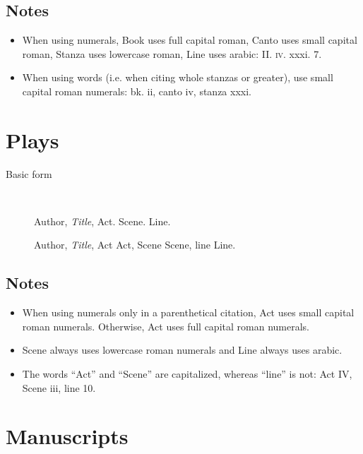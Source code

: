 \documentclass[extrafontsizes,11pt,a4paper,oneside]{memoir}
\newcommand*{\lit}[1]{\textsf{#1}}
\begin{document}
\section{Notes}

\begin{itemize}
  \item When using numerals, Book uses full capital roman, Canto uses small capital roman, Stanza uses lowercase roman, Line uses arabic: II. \textsc{iv}. xxxi. 7.
  
  \item When using words (i.e. when citing whole stanzas or greater), use small capital roman numerals: bk. ii, canto iv, stanza xxxi.
\end{itemize}

\chapter{Plays}\label{sec:play}

\begin{description}
  \item[Basic form]~
  \par Author, \emph{Title}, Act. Scene. Line.
  \par Author, \emph{Title}, \lit{Act} Act, \lit{Scene} Scene, \lit{line} Line.
\end{description}

\section{Notes}

\begin{itemize}
  \item When using numerals only in a parenthetical citation, Act uses small capital roman numerals. Otherwise, Act uses full capital roman numerals.
  
  \item Scene always uses lowercase roman numerals and Line always uses arabic.
  
  \item The words \enquote{Act} and \enquote{Scene} are capitalized, whereas \enquote{line} is not: Act IV, Scene iii, line 10.
\end{itemize}

\chapter{Manuscripts}\label{sec:ms}
\end{document}
